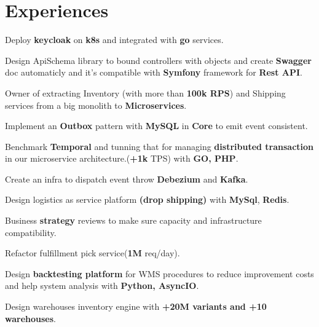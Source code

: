 \documentclass[]{plushcv}
\begin{document}
\begin{minipage}[t]{0.70\textwidth}
\section{Experiences}
\vspace{5pt} %
\begin{tightemize}
\sectionsep
\item Deploy \textbf{keycloak} on \textbf{k8s} and integrated with \textbf{go} services.
\item Design ApiSchema library to bound controllers with objects and create \textbf{Swagger} doc automaticly and it's compatible with \textbf{Symfony} framework for \textbf{Rest API}.
\item Owner of extracting Inventory (with more than \textbf{100k RPS}) and Shipping services from a big monolith to \textbf{Microservices}.
\item Implement an \textbf{Outbox} pattern with \textbf{MySQL} in \textbf{Core} to emit event consistent.
\item Benchmark \textbf{Temporal} and tunning that for managing \textbf{distributed transaction} in our microservice architecture.(\textbf{+1k} TPS) with \textbf{GO, PHP}.
\item Create an infra to dispatch event throw \textbf{Debezium} and \textbf{Kafka}.
\item Design logistics as service platform \textbf{(drop shipping)} with \textbf{MySql}, \textbf{Redis}.
\item Business \textbf{strategy} reviews to make sure capacity and infrastructure compatibility.
\end{tightemize}
\vspace{5pt} %
\begin{tightemize}
\item Refactor fulfillment pick service(\textbf{1M} req/day).
\item Design \textbf{backtesting platform} for WMS procedures to reduce improvement costs and help system analysis with \textbf{Python, AsyncIO}.
\item Design warehouses inventory engine with \textbf{+20M variants and +10 warehouses}.


\end{tightemize}
\end{minipage}
\end{document}
